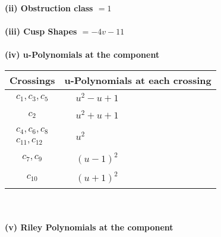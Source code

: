 \documentclass[1p]{elsarticle_modified}
\theoremstyle{definition}
\begin{document}
\flushleft \textbf{(ii) Obstruction class $= 1$}\\~\\
\flushleft \textbf{(iii) Cusp Shapes $= -4 v-11$}\\~\\
\newpage\renewcommand{\arraystretch}{1}
\flushleft \textbf{(iv) u-Polynomials at the component}\newline \\
\begin{tabular}{m{50pt}|m{274pt}}
Crossings & \hspace{64pt}u-Polynomials at each crossing \\
\hline $$\begin{aligned}c_{1},c_{3},c_{5}\end{aligned}$$&$\begin{aligned}
&u^2- u+1
\end{aligned}$\\
\hline $$\begin{aligned}c_{2}\end{aligned}$$&$\begin{aligned}
&u^2+u+1
\end{aligned}$\\
\hline $$\begin{aligned}c_{4},c_{6},c_{8}\\c_{11},c_{12}\end{aligned}$$&$\begin{aligned}
&u^2
\end{aligned}$\\
\hline $$\begin{aligned}c_{7},c_{9}\end{aligned}$$&$\begin{aligned}
&(u-1)^2
\end{aligned}$\\
\hline $$\begin{aligned}c_{10}\end{aligned}$$&$\begin{aligned}
&(u+1)^2
\end{aligned}$\\
\hline
\end{tabular}\\~\\
\newpage\renewcommand{\arraystretch}{1}
\flushleft \textbf{(v) Riley Polynomials at the component}\newline \\
\end{document}
